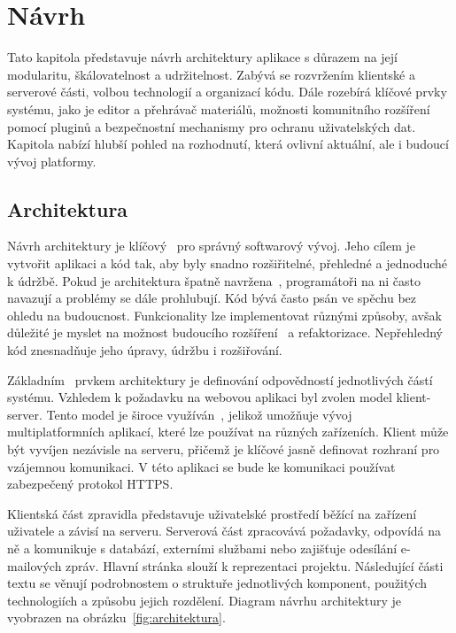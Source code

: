 \chapter{Návrh}\label{text:navrh}

\begin{chapterabstract}
Tato kapitola představuje návrh architektury aplikace s důrazem na její modularitu, škálovatelnost a udržitelnost. 
Zabývá se rozvržením klientské a serverové části, volbou technologií a organizací kódu. 
Dále rozebírá klíčové prvky systému, jako je editor a přehrávač materiálů, možnosti komunitního rozšíření pomocí pluginů a bezpečnostní mechanismy pro ochranu uživatelských dat. 
Kapitola nabízí hlubší pohled na rozhodnutí, která ovlivní aktuální, ale i budoucí vývoj platformy.
\end{chapterabstract}

\section{Architektura}

Návrh architektury je klíčový~\cite{uml_2007} pro správný softwarový vývoj. 
Jeho cílem je vytvořit aplikaci a kód tak, aby byly snadno rozšiřitelné, přehledné a jednoduché k údržbě. 
Pokud je architektura špatně navržena~\cite{uml_2007}, programátoři na ni často navazují a problémy se dále prohlubují.
Kód bývá často psán ve spěchu bez ohledu na budoucnost. 
Funkcionality lze implementovat různými způsoby, avšak důležité je myslet na možnost budoucího rozšíření~\cite{sutherland_2014} a refaktorizace. 
Nepřehledný kód znesnadňuje jeho úpravy, údržbu i rozšiřování.

Základním~\cite{richards_2020} prvkem architektury je definování odpovědností jednotlivých částí systému. 
Vzhledem k požadavku na webovou aplikaci byl zvolen model klient-server. 
Tento model je široce využíván~\cite{richards_2020, uzayr2022frontend}, jelikož umožňuje vývoj multiplatformních aplikací, které lze používat na různých zařízeních. 
Klient může být vyvíjen nezávisle na serveru, přičemž je klíčové jasně definovat rozhraní pro vzájemnou komunikaci. 
V této aplikaci se bude ke komunikaci používat zabezpečený protokol HTTPS.

Klientská část zpravidla představuje uživatelské prostředí běžící na zařízení uživatele a závisí na serveru. 
Serverová část zpracovává požadavky, odpovídá na ně a komunikuje s databází, externími službami nebo zajišťuje odesílání e-mailových zpráv. 
Hlavní stránka slouží k reprezentaci projektu.
Následující části textu se věnují podrobnostem o struktuře jednotlivých komponent, použitých technologiích a způsobu jejich rozdělení. 
Diagram návrhu architektury je vyobrazen na obrázku~\ref{fig:architektura}.


